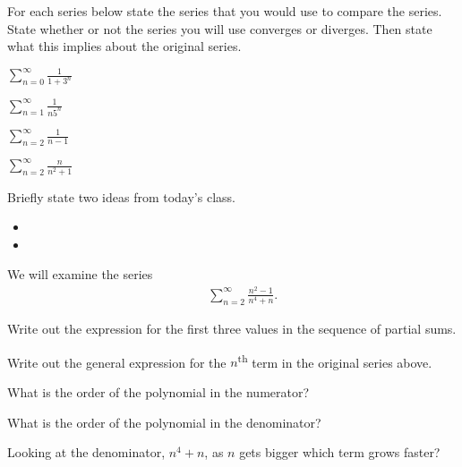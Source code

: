 \begin{problem}
\item For each series below state the series that you would use to compare the series. State whether or not the series you will use converges or diverges.
Then state what this implies about the original series.
  \begin{subproblem}
    \item $\sum_{n=0}^\infty \frac{1}{1+3^n}$
      \vfill
    \item $\sum_{n=1}^\infty \frac{1}{n5^n}$
      \vfill
      \clearpage
    \item $\sum_{n=2}^\infty \frac{1}{n-1}$
      \vfill
    \item $\sum_{n=2}^\infty \frac{n}{n^2+1} $
      \vfill
  \end{subproblem}
\end{problem}


\postClass

\begin{problem}
\item Briefly state two ideas from today's class.
  \begin{itemize}
  \item
  \item
  \end{itemize}
\item
  \begin{subproblem}
    \item
  \end{subproblem}
\end{problem}



\begin{problem}
\item We will examine the series
    \begin{eqnarray*}
      & & \sum^\infty_{n=2} \frac{n^2-1}{n^4+n}.
    \end{eqnarray*}
    \begin{subproblem}
      \item Write out the expression for the first three values in the sequence of partial sums.
      \vfill
      \item Write out the general expression for the $n$\textsuperscript{th} term in the original series above.
        \vfill
      \item What is the order of the polynomial in the numerator?
      \vfill
      \item What is the order of the polynomial in the denominator?
      \vfill
      \item Looking at the denominator, $n^4+n$, as $n$ gets bigger which term grows faster?
      \vfill
    \end{subproblem}
\end{problem}


